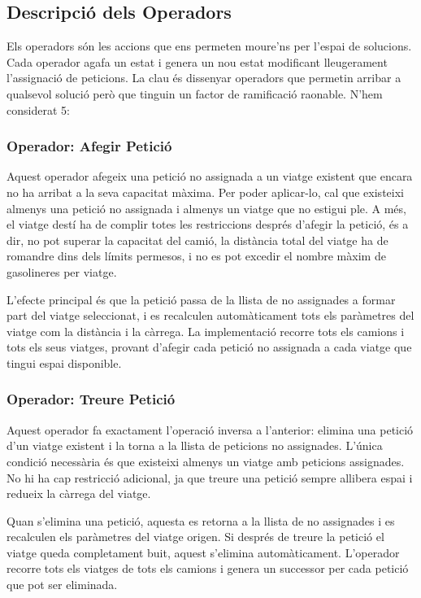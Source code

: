 \label{sec:operadors}

\subsection{Descripció dels Operadors}

Els operadors són les accions que ens permeten moure'ns per l'espai de solucions. Cada operador agafa un estat i genera un nou estat modificant lleugerament l'assignació de peticions. La clau és dissenyar operadors que permetin arribar a qualsevol solució però que tinguin un factor de ramificació raonable. N'hem considerat 5:

\subsubsection{Operador: Afegir Petició}

Aquest operador afegeix una petició no assignada a un viatge existent que encara no ha arribat a la seva capacitat màxima. Per poder aplicar-lo, cal que existeixi almenys una petició no assignada i almenys un viatge que no estigui ple. A més, el viatge destí ha de complir totes les restriccions després d'afegir la petició, és a dir, no pot superar la capacitat del camió, la distància total del viatge ha de romandre dins dels límits permesos, i no es pot excedir el nombre màxim de gasolineres per viatge.

L'efecte principal és que la petició passa de la llista de no assignades a formar part del viatge seleccionat, i es recalculen automàticament tots els paràmetres del viatge com la distància i la càrrega. La implementació recorre tots els camions i tots els seus viatges, provant d'afegir cada petició no assignada a cada viatge que tingui espai disponible.

\subsubsection{Operador: Treure Petició}

Aquest operador fa exactament l'operació inversa a l'anterior: elimina una petició d'un viatge existent i la torna a la llista de peticions no assignades. L'única condició necessària és que existeixi almenys un viatge amb peticions assignades. No hi ha cap restricció adicional, ja que treure una petició sempre allibera espai i redueix la càrrega del viatge.

Quan s'elimina una petició, aquesta es retorna a la llista de no assignades i es recalculen els paràmetres del viatge origen. Si després de treure la petició el viatge queda completament buit, aquest s'elimina automàticament. L'operador recorre tots els viatges de tots els camions i genera un successor per cada petició que pot ser eliminada. 


